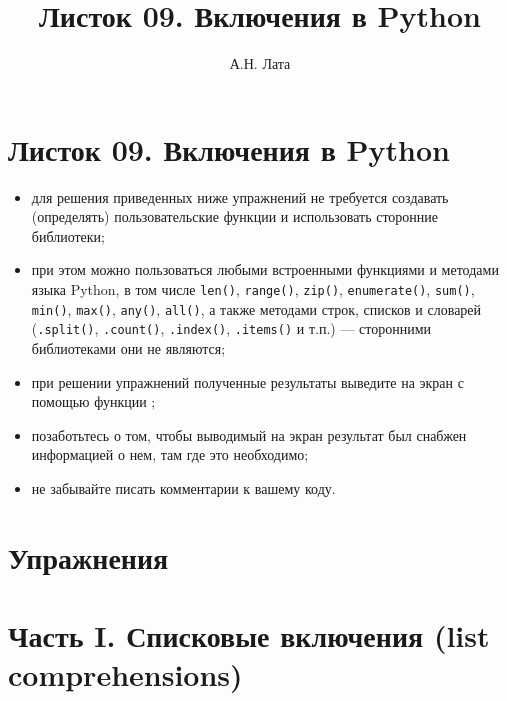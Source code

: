 \documentclass[a4,12pt]{article}
\title{Листок 09. Включения в Python}
\author{А.Н. Лата}
\theoremstyle{remark}
\begin{document}
 


\section*{\centering Листок 09. Включения в Python}

\begin{exercisenote}[title=Замечания]
\begin{itemize}
    \item для решения приведенных ниже упражнений не требуется создавать (определять) пользовательские функции и использовать сторонние библиотеки;
    \item при этом можно пользоваться любыми встроенными функциями и методами языка Python, в том числе \texttt{len()}, \texttt{range()}, \texttt{zip()}, \texttt{enumerate()}, \texttt{sum()}, \texttt{min()}, \texttt{max()}, \texttt{any()}, \texttt{all()}, а также методами строк, списков и словарей (\texttt{.split()}, \texttt{.count()}, \texttt{.index()}, \texttt{.items()} и т.п.) — сторонними библиотеками они не являются;
    \item при решении упражнений полученные результаты выведите на экран с помощью функции {\color{blue}{print()}};
    \item позаботьтесь о том, чтобы выводимый на экран результат был снабжен информацией о нем, там где это необходимо;
    \item не забывайте писать комментарии к вашему коду.
\end{itemize}
\end{exercisenote}

\section*{\centering Упражнения} %

\section*{Часть I. Списковые включения (list comprehensions)}
\end{document}
